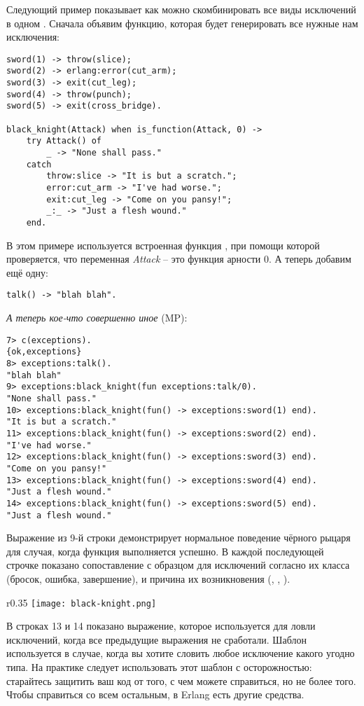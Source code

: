 Следующий пример показывает как можно скомбинировать все виды исключений в одном .
Сначала объявим функцию, которая будет генерировать все нужные нам исключения:
\begin{lstlisting}[style=erlang]
sword(1) -> throw(slice);
sword(2) -> erlang:error(cut_arm);
sword(3) -> exit(cut_leg);
sword(4) -> throw(punch);
sword(5) -> exit(cross_bridge).
 
black_knight(Attack) when is_function(Attack, 0) ->
    try Attack() of
        _ -> "None shall pass."
    catch
        throw:slice -> "It is but a scratch.";
        error:cut_arm -> "I've had worse.";
        exit:cut_leg -> "Come on you pansy!";
        _:_ -> "Just a flesh wound."
    end.
\end{lstlisting}

В этом примере используется встроенная функция , при помощи которой проверяется, что переменная \emph{Attack} \--- это функция арности 0. А теперь добавим ещё одну:
\begin{lstlisting}[style=erlang]
talk() -> "blah blah".
\end{lstlisting}
\emph{А теперь кое\--что совершенно иное} (MP):
\begin{lstlisting}[style=erlang]
7> c(exceptions).
{ok,exceptions}
8> exceptions:talk().
"blah blah"
9> exceptions:black_knight(fun exceptions:talk/0).
"None shall pass."
10> exceptions:black_knight(fun() -> exceptions:sword(1) end).
"It is but a scratch."
11> exceptions:black_knight(fun() -> exceptions:sword(2) end).
"I've had worse."
12> exceptions:black_knight(fun() -> exceptions:sword(3) end).
"Come on you pansy!"
13> exceptions:black_knight(fun() -> exceptions:sword(4) end).
"Just a flesh wound."
14> exceptions:black_knight(fun() -> exceptions:sword(5) end).
"Just a flesh wound."
\end{lstlisting}

Выражение из 9\--й строки демонстрирует нормальное поведение чёрного рыцаря для случая, когда функция выполняется успешно.
В каждой последующей строчке показано сопоставление с образцом для исключений согласно их класса (бросок, ошибка, завершение), и причина их возникновения (, , ).

\begin{wrapfigure}{r}{0.35\linewidth}
    \texttt{[image: black-knight.png]}
\end{wrapfigure}

В строках 13 и 14 показано выражение, которое используется для ловли исключений, когда все предыдущие выражения не сработали.
Шаблон \ops{\_:\_} используется в случае, когда вы хотите словить любое исключение какого угодно типа.
На практике следует использовать этот шаблон с осторожностью: старайтесь защитить ваш код от того, с чем можете справиться, но не более того.
Чтобы справиться со всем остальным, в Erlang есть другие средства.

